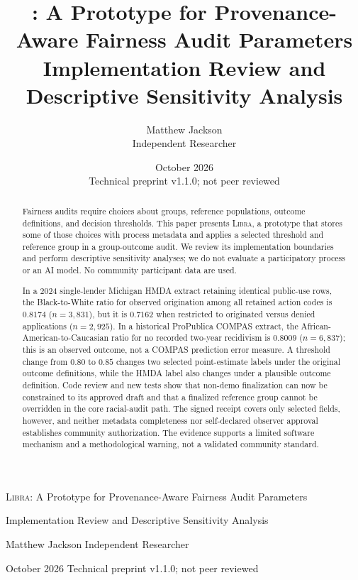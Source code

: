 \documentclass[10pt]{article}
\title{\libra: A Prototype for Provenance-Aware Fairness Audit Parameters\\
\large Implementation Review and Descriptive Sensitivity Analysis}
\author{Matthew Jackson\\Independent Researcher}
\date{October 2026\\Technical preprint v1.1.0; not peer reviewed}
\newcommand{\libra}{\textsc{Libra}}
\begin{document}
\begin{center}
{\Large \libra: A Prototype for Provenance-Aware Fairness Audit Parameters\par}
\vspace{0.35em}
{\large Implementation Review and Descriptive Sensitivity Analysis\par}
\vspace{1em}
Matthew Jackson \enspace\textperiodcentered\enspace Independent Researcher\par
\vspace{0.25em}
{\small October 2026 \enspace\textperiodcentered\enspace Technical preprint v1.1.0; not peer reviewed\par}
\end{center}
\vspace{0.5em}

\begin{abstract}
Fairness audits require choices about groups, reference populations, outcome
definitions, and decision thresholds. This paper presents \libra, a prototype
that stores some of those choices with process metadata and applies a selected
threshold and reference group in a group-outcome audit. We review its
implementation boundaries and perform descriptive sensitivity analyses; we do
not evaluate a participatory process or an AI model. No community participant
data are used.

In a 2024 single-lender Michigan HMDA extract retaining identical public-use
rows, the Black-to-White ratio for observed origination among all retained
action codes is $0.8174$ ($n=3{,}831$), but it is $0.7162$ when restricted to
originated versus denied applications ($n=2{,}925$). In a historical ProPublica COMPAS extract, the
African-American-to-Caucasian ratio for no recorded two-year recidivism is
$0.8009$ ($n=6{,}837$); this is an observed outcome, not a COMPAS prediction
error measure. A threshold change from $0.80$ to $0.85$ changes two selected
point-estimate labels under the original outcome definitions, while the HMDA
label also changes under a plausible outcome definition. Code review and new
tests show that non-demo finalization can now be constrained to its approved
draft and that a finalized reference group cannot be overridden in the core
racial-audit path. The signed receipt covers only selected fields, however,
and neither metadata completeness nor self-declared observer approval
establishes community authorization. The evidence supports a limited software
mechanism and a methodological warning, not a validated community standard.
\end{abstract}
\end{document}

